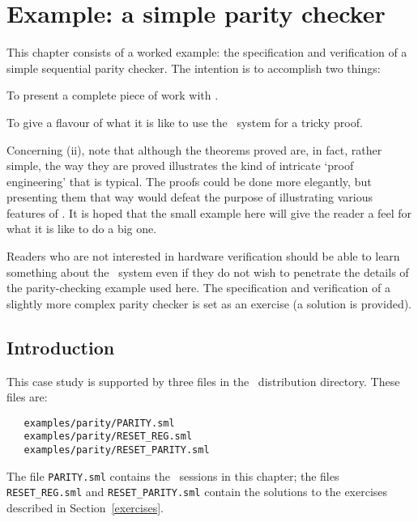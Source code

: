 
\chapter{Example: a simple parity checker}\label{parity}

This chapter consists of a worked example: the specification and
verification of a simple sequential parity checker.  The intention is
to   accomplish two things:

\begin{myenumerate}
\item To present a complete piece of work with \HOL.
\item To give a flavour of what it is like to use the \HOL\
system for a tricky proof.
\end{myenumerate}

Concerning (ii), note that although the theorems proved are, in fact,
rather simple, the way they are proved illustrates the kind of
intricate `proof engineering' that is typical.  The proofs could be
done more elegantly, but presenting them that way would defeat the
purpose of illustrating various features of \HOL. It is hoped that the
small example here will give the reader a feel for what it is like to
do a big one.

Readers who are not interested in hardware verification
should be able to learn something about the
\HOL\ system even if they do not wish to penetrate the details of the
parity-checking example used here.  The specification and verification of a
slightly more complex parity checker is set as an exercise (a solution
is provided).

\section{Introduction}

This case study is supported by three files in
the \HOL\ distribution directory. These files are:

\begin{hol}\begin{verbatim}
   examples/parity/PARITY.sml
   examples/parity/RESET_REG.sml
   examples/parity/RESET_PARITY.sml
\end{verbatim}\end{hol}

The file {\verb|PARITY.sml|} contains the \HOL\ sessions
in this chapter; the files {\verb|RESET_REG.sml|} and
{\verb|RESET_PARITY.sml|} contain the solutions
to the exercises described in Section~\ref{exercises}.

